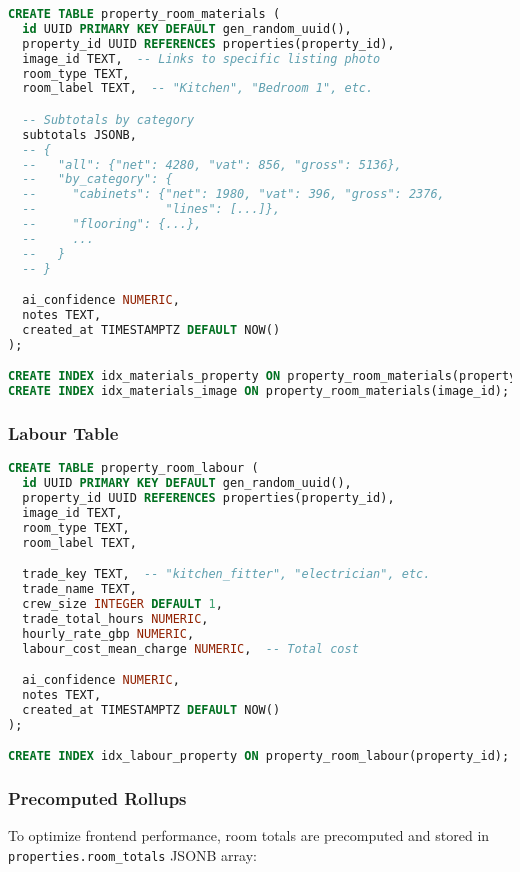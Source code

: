 \documentclass[11pt,a4paper]{article}
\begin{document}
\begin{lstlisting}[language=SQL, caption=property\_room\_materials Schema]
CREATE TABLE property_room_materials (
  id UUID PRIMARY KEY DEFAULT gen_random_uuid(),
  property_id UUID REFERENCES properties(property_id),
  image_id TEXT,  -- Links to specific listing photo
  room_type TEXT,
  room_label TEXT,  -- "Kitchen", "Bedroom 1", etc.

  -- Subtotals by category
  subtotals JSONB,
  -- {
  --   "all": {"net": 4280, "vat": 856, "gross": 5136},
  --   "by_category": {
  --     "cabinets": {"net": 1980, "vat": 396, "gross": 2376,
  --                  "lines": [...]},
  --     "flooring": {...},
  --     ...
  --   }
  -- }

  ai_confidence NUMERIC,
  notes TEXT,
  created_at TIMESTAMPTZ DEFAULT NOW()
);

CREATE INDEX idx_materials_property ON property_room_materials(property_id);
CREATE INDEX idx_materials_image ON property_room_materials(image_id);
\end{lstlisting}

\subsubsection{Labour Table}

\begin{lstlisting}[language=SQL, caption=property\_room\_labour Schema]
CREATE TABLE property_room_labour (
  id UUID PRIMARY KEY DEFAULT gen_random_uuid(),
  property_id UUID REFERENCES properties(property_id),
  image_id TEXT,
  room_type TEXT,
  room_label TEXT,

  trade_key TEXT,  -- "kitchen_fitter", "electrician", etc.
  trade_name TEXT,
  crew_size INTEGER DEFAULT 1,
  trade_total_hours NUMERIC,
  hourly_rate_gbp NUMERIC,
  labour_cost_mean_charge NUMERIC,  -- Total cost

  ai_confidence NUMERIC,
  notes TEXT,
  created_at TIMESTAMPTZ DEFAULT NOW()
);

CREATE INDEX idx_labour_property ON property_room_labour(property_id);
\end{lstlisting}

\subsubsection{Precomputed Rollups}

To optimize frontend performance, room totals are precomputed and stored in \texttt{properties.room\_totals} JSONB array:
\end{document}
